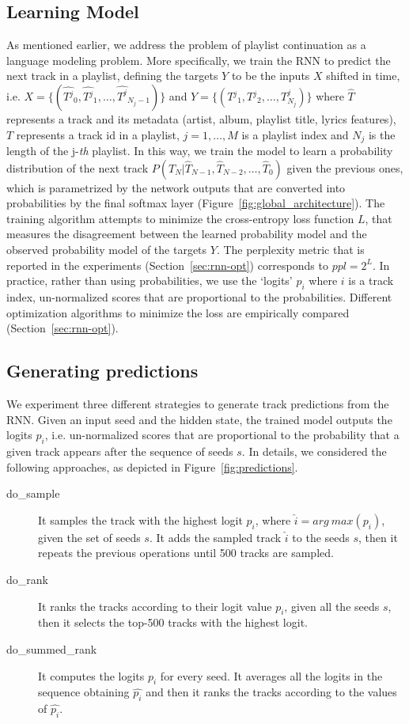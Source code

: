 \subsection{Learning Model}
As mentioned earlier, we address the problem of playlist continuation as a language modeling problem. More specifically, we train the RNN to predict the next track in a playlist, defining the targets $Y$ to be the inputs $X$ shifted in time, i.e. $X = \{(\hat{T{^j}}_0, \hat{T{^j}}_1, \dots, \hat{T^{j}}_{N_j -1})\}$ and $Y = \{(T{^j}_1, T{^j}_2, \dots, T^{j}_{N_j})\}$ where $\hat{T}$ represents a track and its metadata (artist, album, playlist title, lyrics features), $T$ represents a track id in a playlist, $j = 1, \dots, M$ is a playlist index and $N_j$ is the length of the j-\textit{th} playlist. In this way, we train the model to learn a probability distribution of the next track $P (T_N | \hat{T}_{N-1}, \hat{T}_{N-2}, \dots, \hat{T}_{0})$ given the previous ones, which is parametrized by the network outputs that are converted into probabilities by the final softmax layer (Figure~\ref{fig:global_architecture}). The training algorithm attempts to minimize the cross-entropy loss function $L$, that measures the disagreement between the learned probability model and the observed probability model of the targets $Y$. The perplexity metric that is reported in the experiments (Section~\ref{sec:rnn-opt}) corresponds to $ppl = 2^{L}$. In practice, rather than using probabilities, we use the `logits' $p_i$ where $i$ is a track index, un-normalized scores that are proportional to the probabilities. Different optimization algorithms to minimize the loss are empirically compared (Section~\ref{sec:rnn-opt}).

\subsection{Generating predictions}
\label{sec:generation}
We experiment three different strategies to generate track predictions from the RNN. Given an input seed and the hidden state, the trained model outputs the logits $p_i$, i.e. un-normalized scores that are proportional to the probability that a given track appears after the sequence of seeds $s$. In details, we considered the following approaches, as depicted in Figure~\ref{fig:predictions}.
\begin{description}
    \item[do\_sample] It samples the track with the highest logit $p_i$, where $\hat{i} = arg\ max ({p_i})$, given the set of seeds $s$. It adds the sampled track $\hat{i}$ to the seeds $s$, then it repeats the previous operations until 500 tracks are sampled.
    \item[do\_rank] It ranks the tracks according to their logit value $p_i$, given all the seeds $s$, then it selects the top-500 tracks with the highest logit.
    \item[do\_summed\_rank] It computes the logits $p_i$ for every seed. It averages all the logits in the sequence obtaining $\hat{p_i}$ and then it ranks the tracks according to the values of $\hat{p_i}$.
\end{description}

